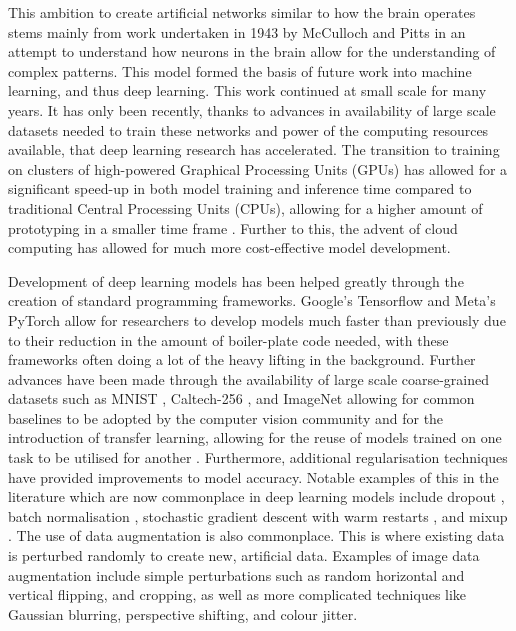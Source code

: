 This ambition to create artificial networks similar to how the brain operates stems mainly from work undertaken in 1943 by McCulloch and Pitts \cite{mcculloch_logical_1943} in an attempt to understand how neurons in the brain allow for the understanding of complex patterns. This model formed the basis of future work into machine learning, and thus deep learning. This work continued at small scale for many years. It has only been recently, thanks to advances in availability of large scale datasets needed to train these networks and power of the computing resources available, that deep learning research has accelerated. The transition to training on clusters of high-powered Graphical Processing Units (GPUs) has allowed for a significant speed-up in both model training and inference time compared to traditional Central Processing Units (CPUs), allowing for a higher amount of prototyping in a smaller time frame \cite{luo_artificial_2005}. Further to this, the advent of cloud computing has allowed for much more cost-effective model development. 

Development of deep learning models has been helped greatly through the creation of standard programming frameworks. Google's Tensorflow \cite{abadi_tensorflow:_2016} and Meta's PyTorch \cite{paszke_automatic_2017} allow for researchers to develop models much faster than previously due to their reduction in the amount of boiler-plate code needed, with these frameworks often doing a lot of the heavy lifting in the background. Further advances have been made through the availability of large scale coarse-grained datasets such as MNIST \cite{lecun_gradient-based_1998}, Caltech-256 \cite{griffin_caltech-256_2007}, and ImageNet \cite{deng_imagenet:_2009} allowing for common baselines to be adopted by the computer vision community and for the introduction of transfer learning, allowing for the reuse of models trained on one task to be utilised for another \cite{pan_survey_2010}. Furthermore, additional regularisation techniques have provided improvements to model accuracy. Notable examples of this in the literature which are now commonplace in deep learning models include dropout \cite{srivastava_dropout:_2014}, batch normalisation \cite{ioffe_batch_2015}, stochastic gradient descent with warm restarts \cite{loshchilov_sgdr:_2016}, and mixup \cite{zhang_mixup:_2017}. The use of data augmentation is also commonplace. This is where existing data is perturbed randomly to create new, artificial data. Examples of image data augmentation include simple perturbations such as random horizontal and vertical flipping, and cropping, as well as more complicated techniques like Gaussian blurring, perspective shifting, and colour jitter.

